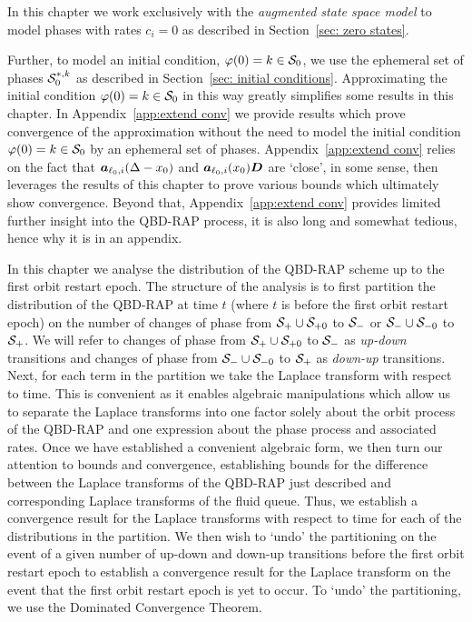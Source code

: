 In this chapter we work exclusively with the \emph{augmented state space model} to model phases with rates \(c_i=0\) as described in Section~\ref{sec: zero states}. 

Further, to model an initial condition, \(\varphi(0)=k\in\mathcal{S}_0\), we use the ephemeral set of phases \(\mathcal{S}_0^{*,k}\) as described in Section~\ref{sec: initial conditions}. Approximating the initial condition \(\varphi(0)=k\in\mathcal{S}_0\) in this way greatly simplifies some results in this chapter. In Appendix~\ref{app:extend conv} we provide results which prove convergence of the approximation without the need to model the initial condition \(\varphi(0)=k\in\mathcal{S}_0\) by an ephemeral set of phases. Appendix~\ref{app:extend conv} relies on the fact that \(\boldsymbol a_{\ell_0,i}(\Delta - x_0)\) and \(\boldsymbol a_{\ell_0,i}(x_0)\boldsymbol D\) are `close', in some sense, then leverages the results of this chapter to prove various bounds which ultimately show convergence. Beyond that, Appendix~\ref{app:extend conv} provides limited further insight into the QBD-RAP process, it is also long and somewhat tedious, hence why it is in an appendix. 

In this chapter we analyse the distribution of the QBD-RAP scheme up to the first orbit restart epoch. The structure of the analysis is to first partition the distribution of the QBD-RAP at time \(t\) (where \(t\) is before the first orbit restart epoch) on the number of changes of phase from \(\mathcal{S}_+\cup\mathcal{S}_{+0}\) to \(\mathcal{S}_-\) or \(\mathcal{S}_-\cup\mathcal{S}_{-0}\) to \(\mathcal{S}_+\). We will refer to changes of phase from \(\mathcal{S}_+\cup\mathcal{S}_{+0}\) to \(\mathcal{S}_-\) as \emph{up-down} transitions and changes of phase from \(\mathcal{S}_-\cup\mathcal{S}_{-0}\) to \(\mathcal{S}_+\) as \emph{down-up} transitions. Next, for each term in the partition we take the Laplace transform with respect to time. This is convenient as it enables algebraic manipulations which allow us to separate the Laplace transforms into one factor solely about the orbit process of the QBD-RAP and one expression about the phase process and associated rates. Once we have established a convenient algebraic form, we then turn our attention to bounds and convergence, establishing bounds for the difference between the Laplace transforms of the QBD-RAP just described and corresponding Laplace transforms of the fluid queue. Thus, we establish a convergence result for the Laplace transforms with respect to time for each of the distributions in the partition. We then wish to `undo' the partitioning on the event of a given number of up-down and down-up transitions before the first orbit restart epoch to establish a convergence result for the Laplace transform on the event that the first orbit restart epoch is yet to occur. To `undo' the partitioning, we use the Dominated Convergence Theorem. 


